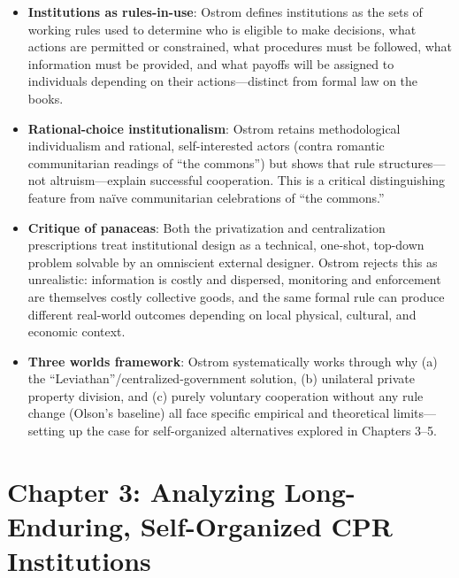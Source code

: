 \documentclass[12pt]{article}
\begin{document}
\begin{itemize}[leftmargin=*, itemsep=4pt]
    \item \textbf{Institutions as rules-in-use}: Ostrom defines institutions as the sets of working rules used to determine who is eligible to make decisions, what actions are permitted or constrained, what procedures must be followed, what information must be provided, and what payoffs will be assigned to individuals depending on their actions---distinct from formal law on the books.
    \item \textbf{Rational-choice institutionalism}: Ostrom retains methodological individualism and rational, self-interested actors (contra romantic communitarian readings of ``the commons'') but shows that rule structures---not altruism---explain successful cooperation. This is a critical distinguishing feature from naïve communitarian celebrations of ``the commons.''
    \item \textbf{Critique of panaceas}: Both the privatization and centralization prescriptions treat institutional design as a technical, one-shot, top-down problem solvable by an omniscient external designer. Ostrom rejects this as unrealistic: information is costly and dispersed, monitoring and enforcement are themselves costly collective goods, and the same formal rule can produce different real-world outcomes depending on local physical, cultural, and economic context.
    \item \textbf{Three worlds framework}: Ostrom systematically works through why (a) the ``Leviathan''/centralized-government solution, (b) unilateral private property division, and (c) purely voluntary cooperation without any rule change (Olson's baseline) all face specific empirical and theoretical limits---setting up the case for self-organized alternatives explored in Chapters 3--5.
\end{itemize}

\section{Chapter 3: Analyzing Long-Enduring, Self-Organized CPR Institutions}
\end{document}
